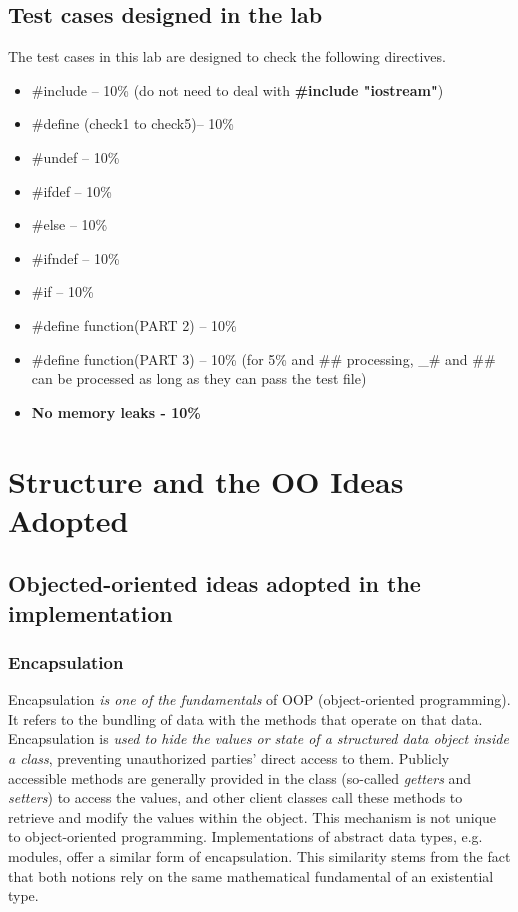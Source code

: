 \documentclass[a4paper]{report}
\begin{document}
\section{Test cases designed in the lab}
The test cases in this lab are designed to check the following directives.
\begin{itemize}
\item \#include – 10\% (do not need to deal with \textbf{\#include "iostream"})
\item \#define (check1 to check5)– 10\%
\item \#undef – 10\%
\item \#ifdef – 10\%
\item \#else – 10\%
\item \#ifndef – 10\%
\item \#if – 10\%
\item \#define function(PART 2) – 10\%
\item \#define function(PART 3) – 10\% (for 5\% and \#\# processing, \_\# and \#\# can be processed as long as they can pass the test file)
\item \textbf{No memory leaks - 10\%}
\end{itemize}

\chapter{Structure and  the OO Ideas Adopted}
\section{Objected-oriented ideas adopted in the implementation}
\subsection{Encapsulation}
Encapsulation \emph{is one of the fundamentals} of OOP (object-oriented programming). It refers to the bundling of data with the methods that operate on that data. Encapsulation is \emph{used to hide the values or state of a structured data object inside a class}, preventing unauthorized parties' direct access to them. Publicly accessible methods are generally provided in the class (so-called \emph{getters} and \emph{setters}) to access the values, and other client classes call these methods to retrieve and modify the values within the object. 
This mechanism is not unique to object-oriented programming. Implementations of abstract data types, e.g. modules, offer a similar form of encapsulation. This similarity stems from the fact that both notions rely on the same mathematical fundamental of an existential type.
\end{document}
